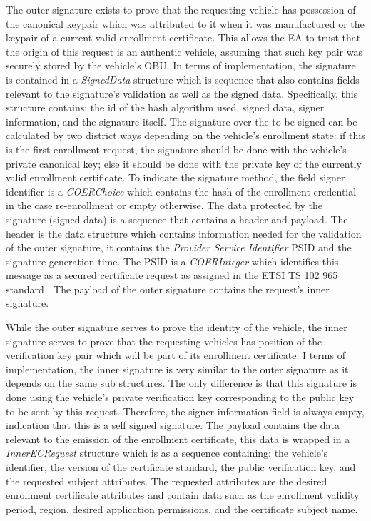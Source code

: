 The outer signature exists to prove that the requesting vehicle has possession of the canonical keypair which was attributed to it when it was manufactured or the keypair of a current valid enrollment certificate. This allows the EA to trust that the origin of this request is an authentic vehicle, assuming that such key pair was securely stored by the vehicle's OBU. In terms of implementation, the signature is contained in a \textit{SignedData} structure which is sequence that also contains fields relevant to the signature's validation as well as the signed data. Specifically, this structure contains: the id of the hash algorithm used, signed data, signer information, and the signature itself. The signature over the to be signed can be calculated by two district ways depending on the vehicle's enrollment state: if this is the first enrollment request, the signature should be done with the vehicle's private canonical key; else it should be done with the private key of the currently valid enrollment certificate. To indicate the signature method, the field signer identifier is a \textit{COERChoice} which contains the hash of the enrollment credential in the case re-enrollment or empty otherwise. The data protected by the signature (signed data) is a sequence that contains a header and payload. The header is the data structure which contains information needed for the validation of the outer signature, it contains the \textit{Provider Service Identifier} PSID and the signature generation time. The PSID is a \textit{COERInteger} which identifies this message as a secured certificate request as assigned in the ETSI TS 102 965 standard \cite{etsi_PSID}. The payload of the outer signature contains the request's inner signature.

While the outer signature serves to prove the identity of the vehicle, the inner signature serves to prove that the requesting vehicles has position of the verification key pair which will be part of its enrollment certificate. I terms of implementation, the inner signature is very similar to the outer signature as it depends on the same sub structures. The only difference is that this signature is done using the vehicle's private verification key corresponding to the public key to be sent by this request. Therefore, the signer information field is always empty, indication that this is a self signed signature. The payload contains the data relevant to the emission of the enrollment certificate, this data is wrapped in a \textit{InnerECRequest} structure which is as a sequence containing: the vehicle's identifier, the version of the certificate standard, the public verification key, and the requested subject attributes. The requested attributes are the desired enrollment certificate attributes and contain data such as the enrollment validity period, region, desired application permissions, and the certificate subject name. 

